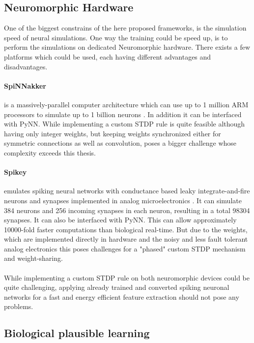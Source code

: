 \subsection{Neuromorphic Hardware} \label{c:neuhard}

One of the biggest constrains of the here proposed frameworks, is the simulation speed of neural simulations.
One way the training could be speed up, is to perform the simulations on dedicated Neuromorphic hardware. 
There exists a few platforms which could be used, each having different advantages and disadvantages.

\paragraph{SpiNNakker} \label{c:spinnakker}
is a massively-parallel computer architecture which can use up to 1 million ARM processors to simulate up to 1 billion neurons \cite{jin2008efficient}. 
In addition it can be interfaced with PyNN. 
While implementing a custom STDP rule is quite feasible although having only integer weights, but keeping weights synchronized either for symmetric connections as well as convolution, poses a bigger challenge whose complexity exceeds this thesis.

\paragraph{Spikey} \label{c:spikey}
emulates spiking neural networks with conductance based leaky integrate-and-fire neurons and synapses implemented in analog microelectronics \cite{Pfeil1311}.
It can simulate 384 neurons and 256 incoming synapses in each neuron, resulting in a total 98304 synapses.
It can also be interfaced with PyNN.
This can allow approximately 10000-fold faster computations than biological real-time.
But due to the weights, which are implemented directly in hardware and the noisy and less fault tolerant analog electronics this poses challenges for a "phased" custom STDP mechanism and weight-sharing. 
\\
\\
While implementing a custom STDP rule on both neuromorphic devices could be quite challenging, applying already trained and converted spiking neuronal networks for a fast and energy efficient feature extraction should not pose any problems.  

\subsection{Biological plausible learning} \label{c:biofuture}


